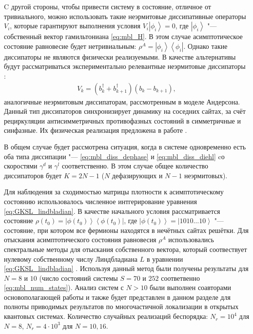 C другой стороны, чтобы привести систему в состояние, отличное от тривиального, можно использовать такие неэрмитовые диссипативные операторы \(V_i\), которые гарантируют выполнения условия \(V_i \left| \phi_i \right\rangle = 0\), где \(\left| \phi_i \right\rangle\) "--- собственный вектор гамильтониана \cref{eq:mbl_H}. В этом случае асимптотическое состояние равновесие будет нетривиальным: \(\rho^A = \left| \phi_i \right\rangle \left\langle \phi_i \right| \). Однако такие диссипаторы не являются физически реализуемыми. В качестве альтернативы будут рассматриваться экспериментально релевантные неэрмитовые диссипаторы \cite{Diehl2008}:
\begin{equation}
\label{eq:mbl_diss_diehl}
\begin{gathered}
V_k = ( b^\dagger_k + b^\dagger_{k+1}) \left( b_k - b_{k+1} \right),
\end{gathered}
\end{equation}
аналогичные неэрмитовым диссипаторам, рассмотренным в моделе Андерсона. 
Данный тип диссипаторов синхронизирует динамику на соседних сайтах, за счёт рециркуляции антисимметричных противофазных состояний в симметричные и синфазные.
Их физическая реализация предложена в работе \cite{Marcos2012}.

В общем случае будет рассмотрена ситуация, когда в системе одновременно есть оба типа диссипации "--- \cref{eq:mbl_diss_dephase} и \cref{eq:mbl_diss_diehl} cо скоростями \(\gamma^d\) и \(\gamma^l\) соответственно. В этом случае общее количество диссипаторов будет \(K = 2 N - 1\) (\(N\) дефазирующих и \(N-1\) неэрмитовых). 

Для наблюдения за сходимостью матрицы плотности к асимптотическому состоянию использовалось численное интгерирование уравнения \cref{eq:GKSL_lindbladian}.
В качестве начального условия рассматривается состояние \(\rho(t_0) =\left| \phi(t_0) \right\rangle \left\langle \phi(t_0) \right| \), где \(\left| \phi(t_0) \right\rangle = \left| 1010\ldots10 \right\rangle\) "--- состояние, при котором все фермионы находятся в нечётных сайтах решётки.
Для отыскания асимптотического состояния равновесия \(\rho^A\) использовались спектральные методы для отыскания собственного вектора, который соотвествует нулевому собственному числу Линдбладиана \(L\) в уравнении \cref{eq:GKSL_lindbladian} \cite{Nation2015, eigenweb, Hernandez2005}. 
Используя данный метод были получены результаты для \(N=8\) и \(10\) (число состояний системы \(S=70\) и  \(252\) соответвенно \cref{eq:mbl_num_states}).
Анализ систем с \(N>10\) были выполнен соавторами основополагающей работы \cite{Vakulchyk2018} и также будет представлен в данном разделе для полноты приводимых результатов по многочастичной локализации в открытых квантовых системах.
Количество случайных реализаций беспорядка: \(N_r=10^4\) для \(N=8\), \(N_r=4 \cdot 10^3 \) для \(N=10, 16\).

